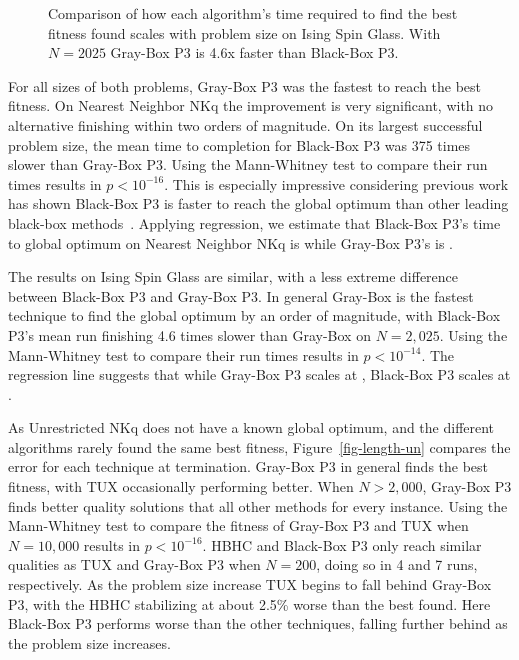 \begin{figure}
  \centering
  \caption{Comparison of how each algorithm's time required to find the best fitness found scales with problem size
  on Ising Spin Glass. With $N=2025$ Gray-Box P3 is 4.6x faster than Black-Box P3.}
  \label{fig-length-is}
\end{figure}

For all sizes of both problems, Gray-Box P3 was the fastest to reach the best fitness. On
Nearest Neighbor NKq the improvement is very significant, with no alternative finishing within
two orders of magnitude. On its largest successful problem size, the mean time to completion for
Black-Box P3 was 375 times slower than Gray-Box P3. Using the Mann-Whitney test to compare their run times
results in $p < 10^{-16}$. This is especially impressive considering
previous work has shown Black-Box P3 is faster to reach the global optimum than other leading black-box
methods~\cite{goldman:2015:fastp3}. Applying regression, we estimate that Black-Box P3's time to global optimum
on Nearest Neighbor NKq is  while Gray-Box P3's is .

The results on Ising Spin Glass are similar, with a less extreme difference between
Black-Box P3 and Gray-Box P3. In general Gray-Box is the fastest technique to
find the global optimum by an order of magnitude, with Black-Box P3's mean run finishing
4.6 times slower than Gray-Box on $N=2,025$. Using the Mann-Whitney test to compare their run times
results in $p < 10^{-14}$. The regression line suggests that while
Gray-Box P3 scales at , Black-Box P3 scales at .

As Unrestricted NKq does not have a known global optimum, and the different algorithms
rarely found the same best fitness, Figure~\ref{fig-length-un} compares the error
for each technique at termination. Gray-Box P3 in general finds the best fitness,
with TUX occasionally performing better. When $N>2,000$, Gray-Box P3 finds better quality
solutions that all other methods for every instance.  Using the Mann-Whitney test to compare the fitness
of Gray-Box P3 and TUX when $N=10,000$ results in $p < 10^{-16}$. HBHC and Black-Box P3 only reach similar
qualities as TUX and Gray-Box P3 when $N=200$, doing so in 4 and 7 runs, respectively. As the problem
size increase TUX begins to fall behind Gray-Box P3, with the HBHC stabilizing at about 2.5\% worse than
the best found. Here Black-Box P3 performs worse than the other techniques,
falling further behind as the problem size increases.

